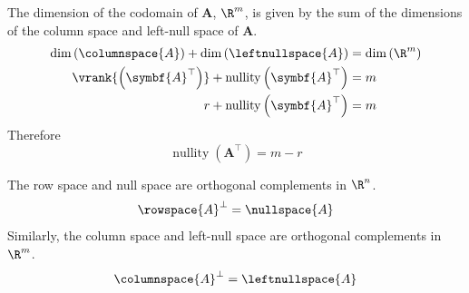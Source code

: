 \documentclass{article}
\DeclareMathOperator*{\nullity}{nullity}
\begin{document}
\begin{corollary}
    The dimension of the codomain of \(\symbf{A}\), \(\R^m\), is given by
    the sum of the dimensions of the column space and left-null space of \(\symbf{A}\).
    \begin{align*}
        \dim{\left( \columnspace{A} \right)} + \dim{\left( \leftnullspace{A} \right)}   & = \dim{\left( \R^m \right)} \\
        \vrank{\left( \symbf{A}^\top \right)} + \nullity{\left( \symbf{A}^\top \right)} & = m                         \\
        r + \nullity{\left( \symbf{A}^\top \right)}                                     & = m
    \end{align*}
    Therefore
    \begin{equation*}
        \nullity{\left( \symbf{A}^\top \right)} = m - r
    \end{equation*}
\end{corollary}
\begin{theorem}
    The row space and null space are orthogonal complements in \(\R^n\).
    \begin{equation*}
        \rowspace{A}^\perp = \nullspace{A}
    \end{equation*}
    Similarly, the column space and left-null space are orthogonal complements in \(\R^m\).
    \begin{equation*}
        \columnspace{A}^\perp = \leftnullspace{A}
    \end{equation*}
\end{theorem}
\end{document}

